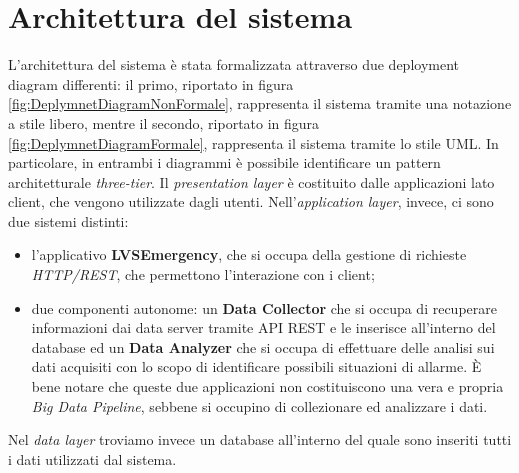 \clearpage
\section{Architettura del sistema}
L'architettura del sistema è stata formalizzata attraverso due deployment diagram differenti: il primo, riportato in figura \ref{fig:DeplymnetDiagramNonFormale}, rappresenta il sistema tramite una notazione a stile libero, mentre il secondo, riportato in figura \ref{fig:DeplymnetDiagramFormale}, rappresenta il sistema tramite lo stile UML. In particolare, in entrambi i diagrammi è possibile identificare un pattern architetturale \textit{three-tier}. Il \textit{presentation layer} è costituito dalle applicazioni lato client, che vengono utilizzate dagli utenti. Nell'\textit{application layer}, invece, ci sono due sistemi distinti:

\begin{itemize}
	\item l'applicativo \textbf{LVSEmergency}, che si occupa della gestione di richieste \textit{HTTP/REST}, che permettono l'interazione con i client;
	\item due componenti autonome: un \textbf{Data Collector} che si occupa di recuperare informazioni dai data server tramite API REST e le inserisce all'interno del database ed un \textbf{Data Analyzer} che si occupa di effettuare delle analisi sui dati acquisiti con lo scopo di identificare possibili situazioni di allarme. È bene notare che queste due applicazioni non costituiscono una vera e propria \textit{Big Data Pipeline}, sebbene si occupino di collezionare ed analizzare i dati.
\end{itemize}

Nel \textit{data layer} troviamo invece un database all'interno del quale sono inseriti tutti i dati utilizzati dal sistema.

